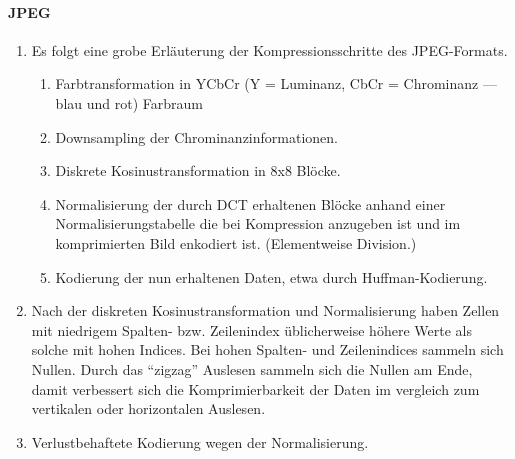 \documentclass{article}
\begin{document}
\paragraph{JPEG}

\begin{enumerate}
    \item Es folgt eine grobe Erl\"auterung der Kompressionsschritte des JPEG-Formats.
    
    \begin{enumerate}[label=\arabic*)]
        \item Farbtransformation in YCbCr (Y = Luminanz, CbCr = Chrominanz --- blau und rot) Farbraum
        \item Downsampling der Chrominanzinformationen.
        \item Diskrete Kosinustransformation in 8x8 Bl\"ocke.
        \item Normalisierung der durch DCT erhaltenen Bl\"ocke anhand einer Normalisierungstabelle die bei Kompression anzugeben ist und im komprimierten Bild enkodiert ist. (Elementweise Division.)
        \item Kodierung der nun erhaltenen Daten, etwa durch Huffman-Kodierung.
    \end{enumerate}

    \item Nach der diskreten Kosinustransformation und Normalisierung haben Zellen mit niedrigem Spalten- bzw. Zeilenindex \"ublicherweise h\"ohere Werte als solche mit hohen Indices. Bei hohen Spalten- und Zeilenindices sammeln sich Nullen. Durch das \enquote{zigzag} Auslesen sammeln sich die Nullen am Ende, damit verbessert sich die Komprimierbarkeit der Daten im vergleich zum vertikalen oder horizontalen Auslesen.
    
    \item Verlustbehaftete Kodierung wegen der Normalisierung.
\end{enumerate}
\end{document}
